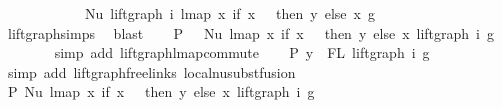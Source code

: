 \begin{isabellebody}
\ \ \ \ \ \ \ \ \ \ \ \ Nu\ {\isacharparenleft}{\kern0pt}lift{\isacharunderscore}{\kern0pt}graph\ i\ {\isacharparenleft}{\kern0pt}lmap\ {\isacharparenleft}{\kern0pt}{\isasymlambda}x{\isachardot}{\kern0pt}\ if\ x\ {\isacharequal}{\kern0pt}\ {}\ then\ y\ else\ x{\isacharparenright}{\kern0pt}\ g{\isacharparenright}{\kern0pt}{\isacharparenright}{\kern0pt}{\isachardoublequoteclose}\isanewline
\ \ \ \ \ \ \isamarkupfalse%
\ lift{\isacharunderscore}{\kern0pt}graph{\isachardot}{\kern0pt}simps{\isacharparenleft}{\kern0pt}{}{\isacharparenright}{\kern0pt}\ \isamarkupfalse%
\ blast\isanewline
\ \ \isamarkupfalse%
\ P{}{\isacharcolon}{\kern0pt}\ {\isachardoublequoteopen}{\isachardot}{\kern0pt}{\isachardot}{\kern0pt}{\isachardot}{\kern0pt}\ {\isacharequal}{\kern0pt}\ Nu\ {\isacharparenleft}{\kern0pt}lmap\ {\isacharparenleft}{\kern0pt}{\isasymlambda}x{\isachardot}{\kern0pt}\ if\ x\ {\isacharequal}{\kern0pt}\ {}\ then\ y\ else\ x{\isacharparenright}{\kern0pt}\ {\isacharparenleft}{\kern0pt}lift{\isacharunderscore}{\kern0pt}graph\ i\ g{\isacharparenright}{\kern0pt}{\isacharparenright}{\kern0pt}{\isachardoublequoteclose}\isanewline
\ \ \ \ \ \ \isamarkupfalse%
\ {\isacharparenleft}{\kern0pt}simp\ add{\isacharcolon}{\kern0pt}\ lift{\isacharunderscore}{\kern0pt}graph{\isacharunderscore}{\kern0pt}lmap{\isacharunderscore}{\kern0pt}commute{\isacharparenright}{\kern0pt}\isanewline
\ \ \isamarkupfalse%
\ P{}{\isacharcolon}{\kern0pt}\ {\isachardoublequoteopen}y\ {\isasymin}\ FL\ {\isacharparenleft}{\kern0pt}lift{\isacharunderscore}{\kern0pt}graph\ i\ g{\isacharparenright}{\kern0pt}{\isachardoublequoteclose}\isanewline
\ \ \ \ \ \isamarkupfalse%
\ {\isacharparenleft}{\kern0pt}simp\ add{\isacharcolon}{\kern0pt}\ lift{\isacharunderscore}{\kern0pt}graph{\isacharunderscore}{\kern0pt}freelinks\ local{\isachardot}{\kern0pt}nu{\isacharunderscore}{\kern0pt}subst{\isacharunderscore}{\kern0pt}fusion{}{\isacharparenright}{\kern0pt}\isanewline
\ \ \isamarkupfalse%
\ \isamarkupfalse%
\ P{}{\isacharcolon}{\kern0pt}\ {\isachardoublequoteopen}Nu\ {\isacharparenleft}{\kern0pt}lmap\ {\isacharparenleft}{\kern0pt}{\isasymlambda}x{\isachardot}{\kern0pt}\ if\ x\ {\isacharequal}{\kern0pt}\ {}\ then\ y\ else\ x{\isacharparenright}{\kern0pt}\ {\isacharparenleft}{\kern0pt}lift{\isacharunderscore}{\kern0pt}graph\ i\ g{\isacharparenright}{\kern0pt}{\isacharparenright}{\kern0pt}\ {\isasymsimeq}\isanewline

\end{isabellebody}
